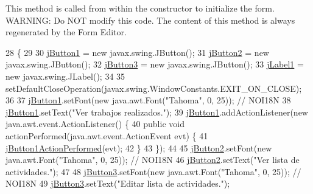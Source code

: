 This method is called from within the constructor to initialize the form. W\+A\+R\+N\+I\+NG\+: Do N\+OT modify this code. The content of this method is always regenerated by the Form Editor. 
\begin{DoxyCode}
28                                   \{
29 
30         \mbox{\hyperlink{classsoftware_1_1parasoftware_a38e0fa900147742a3d209603a3289f14}{jButton1}} = \textcolor{keyword}{new} javax.swing.JButton();
31         \mbox{\hyperlink{classsoftware_1_1parasoftware_a2d756706685fceab8e8cc24f7aece0bf}{jButton2}} = \textcolor{keyword}{new} javax.swing.JButton();
32         \mbox{\hyperlink{classsoftware_1_1parasoftware_a4e3c086e2257863c3de29e92e6f8f027}{jButton3}} = \textcolor{keyword}{new} javax.swing.JButton();
33         \mbox{\hyperlink{classsoftware_1_1parasoftware_a1478f501551ec89939b3b5f30a7d3181}{jLabel1}} = \textcolor{keyword}{new} javax.swing.JLabel();
34 
35         setDefaultCloseOperation(javax.swing.WindowConstants.EXIT\_ON\_CLOSE);
36 
37         \mbox{\hyperlink{classsoftware_1_1parasoftware_a38e0fa900147742a3d209603a3289f14}{jButton1}}.setFont(\textcolor{keyword}{new} java.awt.Font(\textcolor{stringliteral}{"Tahoma"}, 0, 25)); \textcolor{comment}{// NOI18N}
38         \mbox{\hyperlink{classsoftware_1_1parasoftware_a38e0fa900147742a3d209603a3289f14}{jButton1}}.setText(\textcolor{stringliteral}{"Ver trabajos realizados."});
39         \mbox{\hyperlink{classsoftware_1_1parasoftware_a38e0fa900147742a3d209603a3289f14}{jButton1}}.addActionListener(\textcolor{keyword}{new} java.awt.event.ActionListener() \{
40             \textcolor{keyword}{public} \textcolor{keywordtype}{void} actionPerformed(java.awt.event.ActionEvent evt) \{
41                 \mbox{\hyperlink{classsoftware_1_1parasoftware_a866edce40eadaed5d0c19446719b43e6}{jButton1ActionPerformed}}(evt);
42             \}
43         \});
44 
45         \mbox{\hyperlink{classsoftware_1_1parasoftware_a2d756706685fceab8e8cc24f7aece0bf}{jButton2}}.setFont(\textcolor{keyword}{new} java.awt.Font(\textcolor{stringliteral}{"Tahoma"}, 0, 25)); \textcolor{comment}{// NOI18N}
46         \mbox{\hyperlink{classsoftware_1_1parasoftware_a2d756706685fceab8e8cc24f7aece0bf}{jButton2}}.setText(\textcolor{stringliteral}{"Ver lista de actividades."});
47 
48         \mbox{\hyperlink{classsoftware_1_1parasoftware_a4e3c086e2257863c3de29e92e6f8f027}{jButton3}}.setFont(\textcolor{keyword}{new} java.awt.Font(\textcolor{stringliteral}{"Tahoma"}, 0, 25)); \textcolor{comment}{// NOI18N}
49         \mbox{\hyperlink{classsoftware_1_1parasoftware_a4e3c086e2257863c3de29e92e6f8f027}{jButton3}}.setText(\textcolor{stringliteral}{"Editar lista de actividades."});

\end{DoxyCode}
